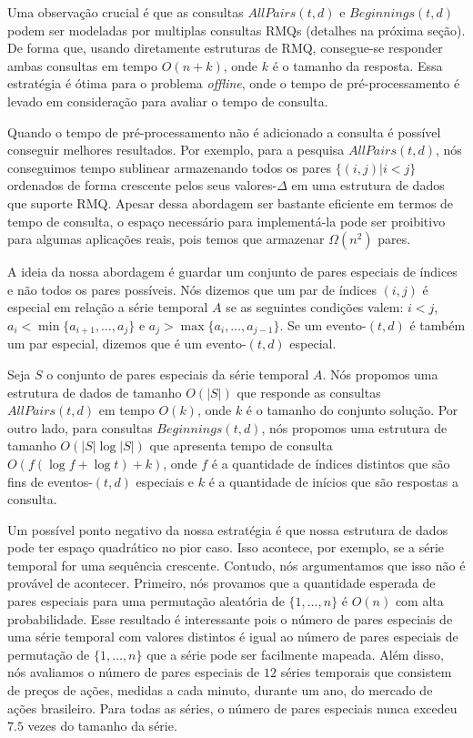 \documentclass[dissertacao, brazil]{ThesisPUC}
\begin{document}
Uma observação crucial é que as consultas $AllPairs(t,d)$ e $Beginnings(t,d)$ podem
ser modeladas por multiplas consultas RMQs (detalhes na próxima seção). 
De forma que, usando diretamente estruturas de RMQ, consegue-se responder ambas consultas
em tempo $O(n + k)$, onde $k$ é o tamanho da resposta. Essa estratégia é ótima para
o problema \textit{offline}, onde o tempo de pré-processamento é levado em consideração
para avaliar o tempo de consulta.

Quando o tempo de pré-processamento não é adicionado a consulta é possível conseguir
melhores resultados. Por exemplo, para a pesquisa $AllPairs(t,d)$, nós conseguimos
tempo sublinear armazenando todos os pares $\{(i,j)| i < j\}$ ordenados de forma crescente
pelos seus valores-$\Delta$ em uma estrutura de dados que suporte RMQ. Apesar 
dessa abordagem ser bastante eficiente em termos de tempo de consulta, o espaço
necessário para implementá-la pode ser proibitivo para algumas aplicações reais, pois
temos que armazenar $\Omega(n^2)$ pares.

A ideia da nossa abordagem é guardar um conjunto de pares especiais de índices
e não todos os pares possíveis. Nós dizemos que um par de índices $(i,j)$ é
especial em relação a série temporal $A$ se as seguintes condições valem:
$i < j$, $a_i < \min\{a_{i+1}, \ldots, a_j\}$ e $a_j > \max\{a_i, \ldots, a_{j-1}\}$. 
Se um evento-$(t, d)$ é também um par especial, dizemos que é um evento-$(t, d)$ especial.

Seja $S$ o conjunto de pares especiais da série temporal $A$. Nós propomos uma estrutura
de dados de tamanho $O(|S|)$ que responde as consultas $AllPairs(t,d)$ em tempo $O(k)$,
onde $k$ é o tamanho do conjunto solução. Por outro lado, para consultas $Beginnings(t,d)$,
nós propomos uma estrutura de tamanho $O(|S|\log|S|)$ que apresenta tempo de consulta $O(f(\log f + \log t) + k)$,
onde $f$ é a quantidade de índices distintos que são fins de eventos-$(t, d)$ especiais e $k$ 
é a quantidade de inícios que são respostas a consulta.

Um possível ponto negativo da nossa estratégia é que nossa estrutura de dados pode
ter espaço quadrático no pior caso. Isso acontece, por exemplo, se a série temporal
for uma sequência crescente. Contudo, nós argumentamos que isso não é provável de acontecer.
Primeiro, nós provamos que a quantidade esperada de pares especiais para uma permutação aleatória
de $\{1, \ldots, n\}$ é $O(n)$ com alta probabilidade. Esse resultado é interessante pois o número
de pares especiais de uma série temporal com valores distintos é igual ao número de pares 
especiais de permutação de $\{1, \ldots, n\}$ que a série pode ser facilmente mapeada. Além disso,
nós avaliamos o número de pares especiais de $12$ séries temporais que consistem de preços de ações,
medidas a cada minuto, durante um ano, do mercado de ações brasileiro. Para todas as séries, 
o número de pares especiais nunca excedeu $7.5$ vezes do tamanho da série. 
\end{document}
